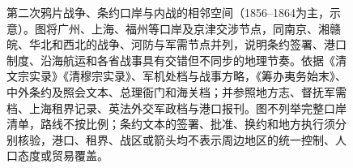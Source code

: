 \begin{figure}[htbp]
  \caption{第二次鸦片战争、条约口岸与内战的相邻空间（1856--1864为主，示意）。图将广州、上海、福州等口岸及京津交涉节点，同南京、湘赣皖、华北和西北的战争、河防与军需节点并列，说明条约签署、港口制度、沿海航运和各省战事具有交错但不同步的地理节奏。依据《清文宗实录》《清穆宗实录》、军机处档与战事方略，《筹办夷务始末》、中外条约及照会文本、总理衙门和海关档；并参照地方志、督抚军需档、上海租界记录、英法外交军政档与港口报刊。图不列举完整口岸清单，路线不按比例；条约文本的签署、批准、换约和地方执行须分别核验，港口、租界、战区或箭头均不表示周边地区的统一控制、人口态度或贸易覆盖。}
  \label{fig:treaty-ports-wars}
\end{figure}

